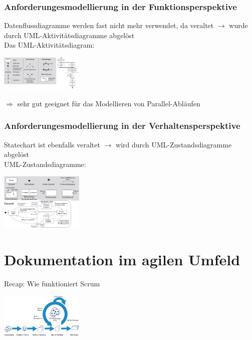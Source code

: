 \documentclass{report}
\newenvironment{Figure}
	{\par\medskip\noindent\minipage{\linewidth}}
	{\endminipage\par\medskip}
\theoremstyle{definition}
\theoremstyle{example}
\begin{document}
\subsubsection{Anforderungesmodellierung in der Funktionsperspektive}
Datenflussdiagramme werden fast nicht mehr verwendet, da veraltet $\rightarrow$ wurde durch UML-Aktivitätsdiagramme abgelöst\\

Das UML-Aktivitätsdiagram:
\begin{Figure}
   \centering
    \includegraphics[width=150px]{img/UMLAktivitatsdiagramm.png}
        \label{fig:Elemente des UML Aktivitaetsdiagram}
\end{Figure}
$\Rightarrow$ sehr gut geeignet für das Modellieren von Parallel-Abläufen


\subsubsection{Anforderungesmodellierung in der Verhaltensperspektive}

Statechart ist ebenfalls veraltet $\rightarrow$ wird durch UML-Zustandsdiagramme abgelöst\\

UML-Zustandsdiagramme:
\begin{Figure}
   \centering
    \includegraphics[width=150px]{img/UMLZustandsdiagram.png}
        \label{fig:Elemente des UML Zustandsdiagram}
\end{Figure}

\section{Dokumentation im agilen Umfeld}
Recap: Wie funktioniert Scrum
\begin{Figure}
   \centering
    \includegraphics[width=150px]{img/Scrum.png}
        \label{fig:Vorgehen nach Scrum}
\end{Figure}
\end{document}
